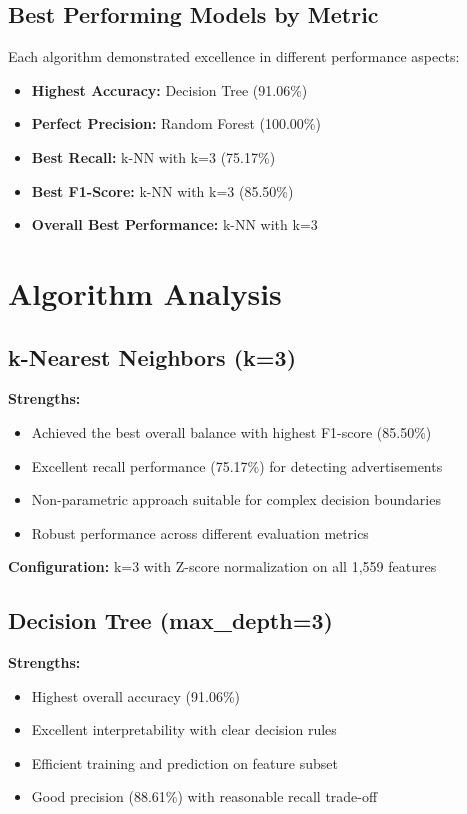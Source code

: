 \subsection{Best Performing Models by Metric}

Each algorithm demonstrated excellence in different performance aspects:

\begin{itemize}
    \item \textbf{Highest Accuracy:} Decision Tree (91.06\%)
    \item \textbf{Perfect Precision:} Random Forest (100.00\%)
    \item \textbf{Best Recall:} k-NN with k=3 (75.17\%)
    \item \textbf{Best F1-Score:} k-NN with k=3 (85.50\%)
    \item \textbf{Overall Best Performance:} k-NN with k=3
\end{itemize}

\section{Algorithm Analysis}

\subsection{k-Nearest Neighbors (k=3)}

\textbf{Strengths:}
\begin{itemize}
    \item Achieved the best overall balance with highest F1-score (85.50\%)
    \item Excellent recall performance (75.17\%) for detecting advertisements
    \item Non-parametric approach suitable for complex decision boundaries
    \item Robust performance across different evaluation metrics
\end{itemize}

\textbf{Configuration:} k=3 with Z-score normalization on all 1,559 features

\subsection{Decision Tree (max\_depth=3)}

\textbf{Strengths:}
\begin{itemize}
    \item Highest overall accuracy (91.06\%)
    \item Excellent interpretability with clear decision rules
    \item Efficient training and prediction on feature subset
    \item Good precision (88.61\%) with reasonable recall trade-off
\end{itemize}

